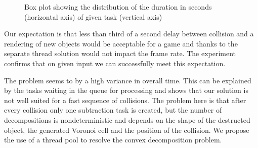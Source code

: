\begin{figure}
\centering
{}
\caption{Box plot showing the distribution of the duration in seconds (horizontal axis) of given task (vertical axis)}
\label{fig:boxtimes}
\end{figure}



Our expectation is that less than third of a second delay between collision and a rendering of new objects would be acceptable for a game and thanks to the separate thread solution would not impact the frame rate. The experiment confirms that on given input we can successfully meet this expectation.

The problem seems to by a high variance in overall time. This can be explained by the tasks waiting in the queue for processing and shows that our solution is not well suited for a fast sequence of collisions. The problem here is that after every collision only one subtraction task is created, but the number of decompositions is nondeterministic and depends on the shape of the destructed object, the generated Voronoi cell and the position of the collision. We propose the use of a thread pool to resolve the convex decomposition problem.

